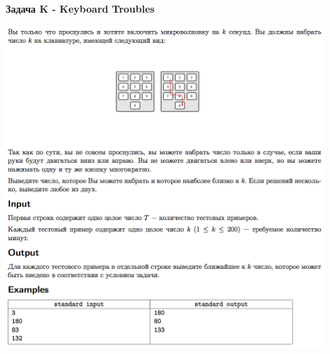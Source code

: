 \documentclass[a4paper,12pt]{article}
\begin{document}
\newpage
\textbf{{\large Задача K - Keyboard Troubles}} \\
\begin{center}
\includegraphics[width=0.9\textwidth]{OC_Europe/OC_Europe_K.png}\\ [1cm]
\end{center}
\newpage
\end{document}
